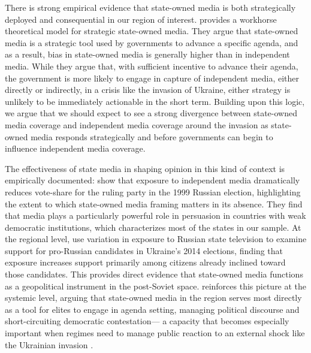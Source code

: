 \documentclass[12pt]{article}
\begin{document}
There is strong empirical evidence that state-owned media is both strategically deployed and consequential in our region of interest. \citet{gehlbach_government_2014} provides a workhorse theoretical model for strategic state-owned media. They argue that state-owned media is a strategic tool used by governments to advance a specific agenda, and as a result, bias in state-owned media is generally higher than in independent media. While they argue that, with sufficient incentive to advance their agenda, the government is more likely to engage in capture of independent media, either directly or indirectly, in a crisis like the invasion of Ukraine, either strategy is unlikely to be immediately actionable in the short term. Building upon this logic, we argue that we should expect to see a strong divergence between state-owned media coverage and independent media coverage around the invasion as state-owned media responds strategically and before governments can begin to influence independent media coverage. 

The effectiveness of state media in shaping opinion in this kind of context is empirically documented: \citet{enikolopov_media_2011} show that exposure to independent media dramatically reduces vote-share for the ruling party in the 1999 Russian election, highlighting the extent to which state-owned media framing matters in its absence. They find that media plays a particularly powerful role in persuasion in countries with weak democratic institutions, which characterizes most of the states in our sample. At the regional level, \citet{peisakhin_electoral_2018} use variation in exposure to Russian state television to examine support for pro-Russian candidates in Ukraine's 2014 elections, finding that exposure increases support primarily among citizens already inclined toward those candidates. This provides direct evidence that state-owned media functions as a geopolitical instrument in the post-Soviet space. \citet{oates_television_2006} reinforces this picture at the systemic level, arguing that state-owned media in the region serves most directly as a tool for elites to engage in agenda setting, managing political discourse and short-circuiting democratic contestation--- a capacity that becomes especially important when regimes need to manage public reaction to an external shock like the Ukrainian invasion \citep{oates_russian_2016}.
\end{document}
